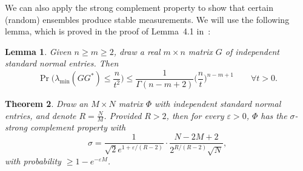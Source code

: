 \documentclass[times,10pt]{elsarticle}
\theoremstyle{plain}
\newtheorem{theorem}{Theorem}
\newtheorem{lemma}[theorem]{Lemma}
\begin{document}
We can also apply the strong complement property to show that certain (random) ensembles produce stable measurements.
We will use the following lemma, which is proved in the proof of Lemma~4.1 in~\cite{ChenD:05}:

\begin{lemma}
\label{lemma.random bound smallest eigenvalue}
Given $n\geq m\geq2$, draw a real $m\times n$ matrix $G$ of independent standard normal entries.
Then
\begin{equation*}
\operatorname{Pr}\bigg(\lambda_\mathrm{min}(GG^*)\leq\frac{n}{t^2}\bigg)\leq\frac{1}{\Gamma(n-m+2)}\bigg(\frac{n}{t}\bigg)^{n-m+1}
\qquad
\forall t>0.
\end{equation*}
\end{lemma}

\begin{theorem}
\label{theorem.random scp bound}
Draw an $M\times N$ matrix $\Phi$ with independent standard normal entries, and denote $R=\frac{N}{M}$.
Provided $R>2$, then for every $\varepsilon>0$, $\Phi$ has the $\sigma$-strong complement property with
\begin{equation*}
\sigma
=\frac{1}{\sqrt{2}e^{1+\varepsilon/(R-2)}}\cdot\frac{N-2M+2}{2^{R/(R-2)}\sqrt{N}},
\end{equation*}
with probability $\geq1-e^{-\varepsilon M}$.
\end{theorem}
\end{document}
